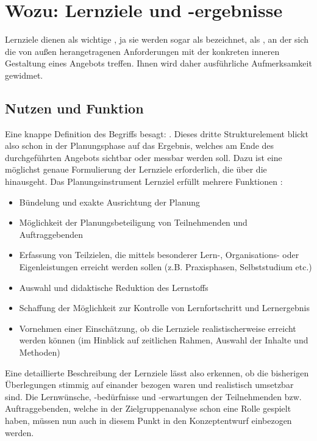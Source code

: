 \documentclass[
  twoside,
  parskip=half-,
]{scrreprt}
\begin{document}
\section{Wozu: Lernziele und -ergebnisse}
Lernziele dienen als wichtige , ja sie werden sogar als  bezeichnet, als , an der sich die von außen herangetragenen Anforderungen mit der konkreten inneren Gestaltung eines Angebots treffen. Ihnen wird daher ausführliche Aufmerksamkeit gewidmet.

\subsection{{Nutzen und Funktion}}
 Eine knappe Definition des Begriffs besagt: .
Dieses dritte Strukturelement blickt also schon in der Planungsphase auf das Ergebnis, welches am Ende des durchgeführten Angebots sichtbar oder messbar werden soll. Dazu ist eine möglichst genaue Formulierung der Lernziele erforderlich, die über die  hinausgeht. Das Planungsinstrument Lernziel erfüllt mehrere Funktionen \autocites[96]{schlutz}[vgl. auch][1008]{reich-claassen}:
\begin{itemize}
  \item Bündelung und exakte Ausrichtung der Planung
  \item Möglichkeit der Planungsbeteiligung von Teilnehmenden und Auftraggebenden
  \item Erfassung von Teilzielen, die mittels besonderer Lern-, Organisations- oder Eigenleistungen erreicht werden sollen (z.B. Praxisphasen, Selbststudium etc.)
  \item Auswahl und didaktische Reduktion des Lernstoffs
  \item Schaffung der Möglichkeit zur Kontrolle von Lernfortschritt und Lernergebnis
  \item Vornehmen einer Einschätzung, ob die Lernziele realistischerweise erreicht werden können (im Hinblick auf zeitlichen Rahmen, Auswahl der Inhalte und Methoden)
\end{itemize}

Eine detaillierte Beschreibung der Lernziele lässt also erkennen, ob die bisherigen Überlegungen stimmig auf einander bezogen waren und realistisch umsetzbar sind. Die Lernwünsche, -bedürfnisse und -erwartungen der Teilnehmenden bzw. Auftraggebenden, welche in der Zielgruppenanalyse schon eine Rolle gespielt haben, müssen nun auch in diesem Punkt in den Konzeptentwurf einbezogen werden.
\end{document}
